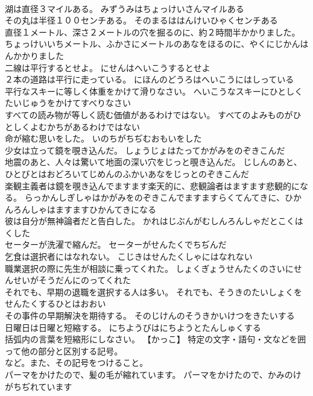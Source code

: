 \documentclass[8pt]{extreport}
\begin{document}
\begin{CJK}{UTF8}{min}
\\	湖は直径３マイルある。	みずうみはちょっけいさんマイルある 
\\	その丸は半径１００センチある。	そのまるははんけいひゃくセンチある 
\\	直径１メートル、深さ２メートルの穴を掘るのに、約２時間半かかりました。	ちょっけいいちメートル、ふかさにメートルのあなをほるのに、やくにじかんはんかかりました 
\\	二線は平行するとせよ。	にせんはへいこうするとせよ 
\\	２本の道路は平行に走っている。	にほんのどうろはへいこうにはしっている 
\\	平行なスキーに等しく体重をかけて滑りなさい。	へいこうなスキーにひとしくたいじゅうをかけてすべりなさい 
\\	すべての読み物が等しく読む価値があるわけではない。	すべてのよみものがひとしくよむかちがあるわけではない 
\\	命が縮む思いをした。	いのちがちぢむおもいをした 
\\	少女は立って鏡を覗き込んだ。	しょうじょはたってかがみをのぞきこんだ 
\\	地震のあと、人々は驚いて地面の深い穴をじっと覗き込んだ。	じしんのあと、ひとびとはおどろいてじめんのふかいあなをじっとのぞきこんだ
\\	楽観主義者は鏡を覗き込んでますます楽天的に、悲観論者はますます悲観的になる。	らっかんしぎしゃはかがみをのぞきこんでますますらくてんてきに、ひかんろんしゃはますますひかんてきになる 
\\	彼は自分が無神論者だと告白した。	かれはじぶんがむしんろんしゃだとこくはくした 
\\	セーターが洗濯で縮んだ。	セーターがせんたくでちぢんだ 
\\	乞食は選択者にはなれない。	こじきはせんたくしゃにはなれない 
\\	職業選択の際に先生が相談に乗ってくれた。	しょくぎょうせんたくのさいにせんせいがそうだんにのってくれた 
\\	それでも、早期の退職を選択する人は多い。	それでも、そうきのたいしょくをせんたくするひとはおおい 
\\	その事件の早期解決を期待する。	そのじけんのそうきかいけつをきたいする 
\\	日曜日は日曜と短縮する。	にちようびはにちようとたんしゅくする 
\\	括弧内の言葉を短縮形にしなさい。	【かっこ】 特定の文字・語句・文などを囲って他の部分と区別する記号。
\\	など。また、その記号をつけること。
\\	パーマをかけたので、髪の毛が縮れています。	パーマをかけたので、かみのけがちぢれています 

\end{CJK}
\end{document}
